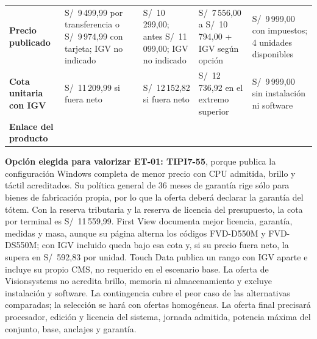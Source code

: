 \begin{table}[p]
\begin{tabularx}{\linewidth}{@{}>{\raggedright\arraybackslash}p{2.15cm}YYYY@{}}
\textbf{Precio publicado} & S/~9\,499,99 por transferencia o S/~9\,974,99 con tarjeta; IGV no indicado & S/~10\,299,00; antes S/~11\,099,00; IGV no indicado & S/~7\,556,00 a S/~10\,794,00 + IGV según opción & S/~9\,999,00 con impuestos; 4 unidades disponibles\\
\textbf{Cota unitaria con IGV} & S/~11\,209,99 si fuera neto & S/~12\,152,82 si fuera neto & S/~12\,736,92 en el extremo superior & S/~9\,999,00 sin instalación ni software\\
\textbf{Enlace del producto} &  &  &  & \\
\bottomrule
\end{tabularx}
\end{table}

\textbf{Opción elegida para valorizar ET-01: TIPI7-55}, porque publica la configuración Windows completa de menor precio con CPU admitida, brillo y táctil acreditados. Su política general de 36 meses de garantía rige sólo para bienes de fabricación propia, por lo que la oferta deberá declarar la garantía del tótem. Con la reserva tributaria y la reserva de licencia del presupuesto, la cota por terminal es S/~11\,559,99. First View documenta mejor licencia, garantía, medidas y masa, aunque su página alterna los códigos FVD-D550M y FVD-DS550M; con IGV incluido queda bajo esa cota y, si su precio fuera neto, la supera en S/~592,83 por unidad. Touch Data publica un rango con IGV aparte e incluye su propio CMS, no requerido en el escenario base. La oferta de Visionsystems no acredita brillo, memoria ni almacenamiento y excluye instalación y software. La contingencia cubre el peor caso de las alternativas comparadas; la selección se hará con ofertas homogéneas. La oferta final precisará procesador, edición y licencia del sistema, jornada admitida, potencia máxima del conjunto, base, anclajes y garantía.

